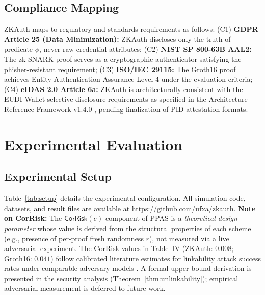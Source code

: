 \documentclass[journal,12pt,onecolumn]{IEEEtran}
\begin{document}
\subsection{Compliance Mapping}

ZKAuth maps to regulatory and standards requirements as follows:
(C1) \textbf{GDPR Article 25 (Data Minimization):} ZKAuth discloses
only the truth of predicate $\phi$, never raw credential attributes;
(C2) \textbf{NIST SP 800-63B AAL2:} The zk-SNARK proof serves as a
cryptographic authenticator satisfying the phisher-resistant requirement;
(C3) \textbf{ISO/IEC 29115:} The Groth16 proof achieves Entity
Authentication Assurance Level 4 under the evaluation criteria;
(C4) \textbf{eIDAS 2.0 Article 6a:} ZKAuth is architecturally
consistent with the EUDI Wallet selective-disclosure requirements
as specified in the Architecture Reference Framework v1.4.0
\cite{eudi_arf_2024}, pending finalization of PID attestation formats.

\section{Experimental Evaluation}
\label{sec:evaluation}

\subsection{Experimental Setup}

Table~\ref{tab:setup} details the experimental configuration.
All simulation code, datasets, and result files are available at
\url{https://github.com/ufxa/zkauth}. \textbf{Note on CorRisk:} The $\mathsf{CorRisk}(e)$
component of PPAS is a \emph{theoretical design parameter} whose
value is derived from the structural properties of each scheme (e.g.,
presence of per-proof fresh randomness $r$), not measured via a live
adversarial experiment. The CorRisk values in Table~IV (ZKAuth:
$0.008$; Groth16: $0.041$) follow calibrated literature estimates
for linkability attack success rates under comparable adversary models
\cite{cheng2024correlation}. A formal upper-bound derivation is
presented in the security analysis (Theorem~\ref{thm:unlinkability});
empirical adversarial measurement is deferred to future work.
\end{document}
